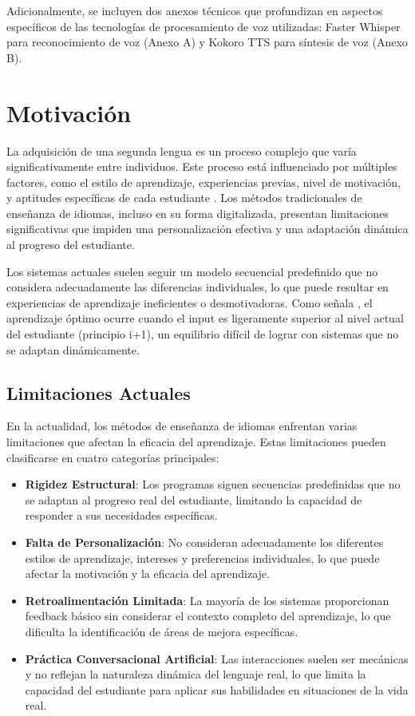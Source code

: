 Adicionalmente, se incluyen dos anexos técnicos que profundizan en aspectos específicos de las tecnologías de procesamiento de voz utilizadas: Faster Whisper para reconocimiento de voz (Anexo A) y Kokoro TTS para síntesis de voz (Anexo B).

\section{Motivación}
\label{sec:motivacion}

La adquisición de una segunda lengua es un proceso complejo que varía significativamente entre individuos. Este proceso está influenciado por múltiples factores, como el estilo de aprendizaje, experiencias previas, nivel de motivación, y aptitudes específicas de cada estudiante \cite{ellis1994study}. Los métodos tradicionales de enseñanza de idiomas, incluso en su forma digitalizada, presentan limitaciones significativas que impiden una personalización efectiva y una adaptación dinámica al progreso del estudiante.

Los sistemas actuales suelen seguir un modelo secuencial predefinido que no considera adecuadamente las diferencias individuales, lo que puede resultar en experiencias de aprendizaje ineficientes o desmotivadoras. Como señala \cite{krashen1982principles}, el aprendizaje óptimo ocurre cuando el input es ligeramente superior al nivel actual del estudiante (principio i+1), un equilibrio difícil de lograr con sistemas que no se adaptan dinámicamente.

\subsection{Limitaciones Actuales}
\label{subsec:limitaciones-actuales}

En la actualidad, los métodos de enseñanza de idiomas enfrentan varias limitaciones que afectan la eficacia del aprendizaje. Estas limitaciones pueden clasificarse en cuatro categorías principales:

\begin{itemize}
  \item \textbf{Rigidez Estructural}: Los programas siguen secuencias predefinidas que no se adaptan al progreso real del estudiante, limitando la capacidad de responder a sus necesidades específicas.
  \item \textbf{Falta de Personalización}: No consideran adecuadamente los diferentes estilos de aprendizaje, intereses y preferencias individuales, lo que puede afectar la motivación y la eficacia del aprendizaje.
  \item \textbf{Retroalimentación Limitada}: La mayoría de los sistemas proporcionan feedback básico sin considerar el contexto completo del aprendizaje, lo que dificulta la identificación de áreas de mejora específicas.
  \item \textbf{Práctica Conversacional Artificial}: Las interacciones suelen ser mecánicas y no reflejan la naturaleza dinámica del lenguaje real, lo que limita la capacidad del estudiante para aplicar sus habilidades en situaciones de la vida real.
\end{itemize}

